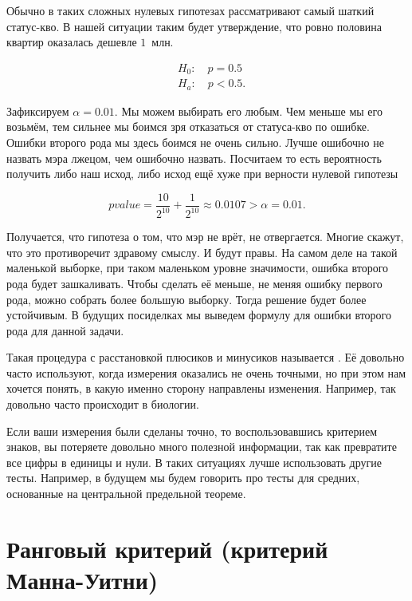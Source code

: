 \documentclass[12pt, a4paper, oneside]{article}
\begin{document}
Обычно в таких сложных нулевых гипотезах рассматривают самый шаткий статус-кво. В нашей ситуации таким будет утверждение, что ровно половина квартир оказалась дешевле $1$~млн.

\begin{equation*} 
    \begin{aligned} 
        &H_0: \quad p = 0.5 \\
        &H_a: \quad p < 0.5.
    \end{aligned} 
\end{equation*}

Зафиксируем  $\alpha = 0.01.$ Мы можем выбирать его любым. Чем меньше мы его возьмём, тем сильнее мы боимся зря отказаться от статуса-кво по ошибке. Ошибки второго рода мы здесь боимся не очень сильно. Лучше ошибочно не назвать мэра лжецом, чем ошибочно назвать. Посчитаем  то есть вероятность получить либо наш исход, либо исход ещё хуже при верности нулевой гипотезы 

\[
pvalue = \frac{10}{2^{10}} + \frac{1}{2^{10}} \approx 0.0107 > \alpha = 0.01.
\]

Получается, что гипотеза о том, что мэр не врёт, не отвергается. Многие скажут, что это противоречит здравому смыслу. И будут правы. На самом деле на такой маленькой выборке, при таком маленьком уровне значимости, ошибка второго рода будет зашкаливать. Чтобы сделать её меньше, не меняя ошибку первого рода, можно собрать более большую выборку. Тогда решение будет более устойчивым. В будущих посиделках мы выведем формулу для ошибки второго рода для данной задачи. 

Такая процедура с расстановкой плюсиков и минусиков называется . Её довольно часто используют, когда измерения оказались не очень точными, но при этом нам хочется понять, в какую именно сторону направлены изменения. Например, так довольно часто происходит в биологии. 

Если ваши измерения были сделаны точно, то воспользовавшись критерием знаков, вы потеряете довольно много полезной информации, так как превратите все цифры в единицы и нули. В таких ситуациях лучше использовать другие тесты. Например, в будущем мы будем говорить про тесты для средних, основанные на центральной предельной теореме.  

\section{Ранговый критерий (критерий Манна-Уитни)}
\end{document}
